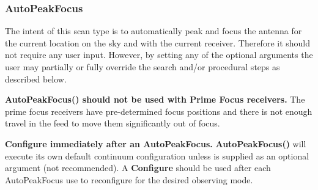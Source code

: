 \subsubsection{AutoPeakFocus}
The intent of this scan type is to automatically peak and focus the antenna
for the current location on the sky and with the current receiver. Therefore
it should not require any user input. However, by setting any of the
optional arguments the user may partially or fully override the search
and/or procedural steps as described below.

{\bf AutoPeakFocus() should not be used with Prime Focus receivers.}
The prime focus receivers have pre-determined focus positions and there
is not enough travel in the feed to move them significantly out of focus.

{\bf Configure immediately after an AutoPeakFocus.}
{\bfseries{\textcolor{pythonKeywords}{AutoPeakFocus}}()}
will execute its own default continuum configuration unless
 is supplied as an optional argument (not recommended).
A {\bfseries{\textcolor{pythonKeywords}{Configure}}} should be used after each
AutoPeakFocus use to reconfigure for the desired observing mode.

